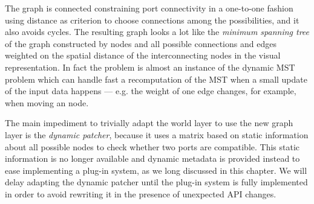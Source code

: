 %

The graph is connected constraining port connectivity in a one-to-one
fashion using distance as criterion to choose connections among the
possibilities, and it also avoids cycles. The resulting graph looks a
lot like the \emph{minimum spanning
  tree} of the graph constructed by nodes and all possible connections
and edges weighted on the spatial distance of the interconnecting
nodes in the visual representation. In fact the problem is almost an
instance of the dynamic MST problem \cite{spira75dmst} which can
handle fast a recomputation of the MST when a small update of the
input data happens --- e.g. the weight of one edge changes, for
example, when moving an node.

The main impediment to trivially adapt the world layer to use the new
graph layer is the \emph{dynamic patcher}, because it uses a matrix
based on static information about all possible nodes to check whether
two ports are compatible. This static information is no longer
available and dynamic metadata is provided instead to ease
implementing a plug-in system, as we long discussed in this
chapter. We will delay adapting the dynamic patcher until the plug-in
system is fully implemented in order to avoid rewriting it in the
presence of unexpected API changes.

